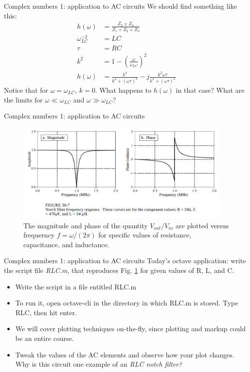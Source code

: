 \documentclass{beamer}
\begin{document}
\begin{frame}{Complex numbers 1: application to AC circuits}
We should find something like this:
\begin{align}
h(\omega) &= \frac{Z_2 + Z_3}{Z_1+Z_2+Z_3} \\
\omega_{LC}^{-2} &= LC \\
\tau &= RC \\
k^2 &= 1-\left(\frac{\omega}{\omega_{LC}}\right)^2 \\
h(\omega) &= \frac{k^4}{k^4+(\omega\tau)^2}-j \frac{k^2\omega\tau}{k^4+(\omega\tau)^2}
\end{align}
Notice that for $\omega = \omega_{LC}$, $k=0$.  What happens to $h(\omega)$ in that case?  What are the limits for $\omega \ll \omega_{LC}$ and $\omega \gg \omega_{LC}$?
\end{frame}

\begin{frame}{Complex numbers 1: application to AC circuits}
\begin{figure}
\centering
\includegraphics[width=0.95\textwidth]{figures/RLC2.png}
\caption{\label{fig:RLC3}  The magnitude and phase of the quantity $V_{out}/V_{in}$ are plotted versus frequerncy $f = \omega/(2\pi)$ for specific values of resistance, capacitance, and inductance.}
\end{figure}
\end{frame}

\begin{frame}{Complex numbers 1: application to AC circuits}
Today's octave application: write the script file \textit{RLC.m}, that reproduces Fig. \ref{fig:RLC3} for given values of R, L, and C.
\begin{itemize}
\item Write the script in a file entitled RLC.m
\item To run it, open octave-cli in the directory in which RLC.m is stored.  Type RLC, then hit enter.
\item We will cover plotting techniques on-the-fly, since plotting and markup could be an entire course.
\item Tweak the values of the AC elements and observe how your plot changes.  Why is this circuit one example of an \textit{RLC notch filter?}
\end{itemize}
\end{frame}
\end{document}
